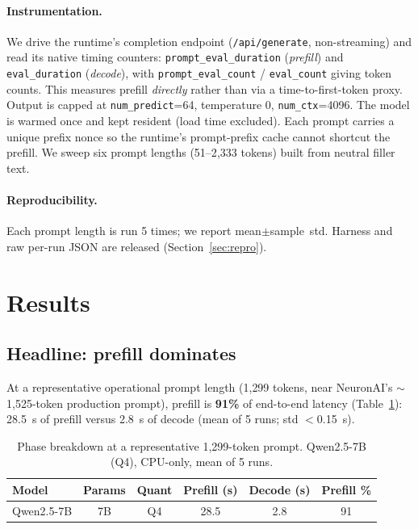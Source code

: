 \documentclass[sigconf,nonacm,10pt]{acmart}
\begin{document}
\paragraph{Instrumentation.}
We drive the runtime's completion endpoint (\texttt{/api/generate},
non-streaming) and read its native timing counters:
\texttt{prompt\_eval\_duration} (\emph{prefill}) and \texttt{eval\_duration}
(\emph{decode}), with \texttt{prompt\_eval\_count} / \texttt{eval\_count}
giving token counts. This measures prefill \emph{directly} rather than via
a time-to-first-token proxy. Output is capped at \texttt{num\_predict}=64,
temperature 0, \texttt{num\_ctx}=4096. The model is warmed once and kept
resident (load time excluded). Each prompt carries a unique prefix nonce so
the runtime's prompt-prefix cache cannot shortcut the prefill. We sweep six
prompt lengths (51--2{,}333 tokens) built from neutral filler text.

\paragraph{Reproducibility.}
Each prompt length is run 5 times; we report mean$\pm$sample~std. Harness
and raw per-run JSON are released (Section~\ref{sec:repro}).

\section{Results}
\label{sec:results}

\subsection{Headline: prefill dominates}
\label{sec:results-headline}
At a representative operational prompt length (1{,}299 tokens, near
NeuronAI's $\sim$1{,}525-token production prompt), prefill is
\textbf{91\%} of end-to-end latency (Table~\ref{tab:money}): 28.5~s of
prefill versus 2.8~s of decode (mean of 5 runs; std $<$0.15~s).

\begin{table}[t]
  \centering
  \caption{Phase breakdown at a representative 1{,}299-token prompt.
  Qwen2.5-7B (Q4), CPU-only, mean of 5 runs.}
  \label{tab:money}
  \begin{tabular}{lccccc}
    \toprule
    Model & Params & Quant & Prefill (s) & Decode (s) & Prefill \% \\
    \midrule
    Qwen2.5-7B & 7B & Q4 & 28.5 & 2.8 & 91 \\
    \bottomrule
  \end{tabular}
\end{table}
\end{document}
